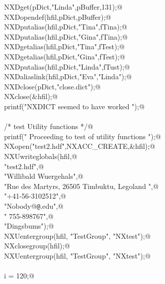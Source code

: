 \documentclass[12pt]{article}
\begin{document}
{\begin{flushleft}
\begin{minipage}{\linewidth}
\begin{list}{}{}
\mbox{}\verb@      NXDget(pDict,"Linda",pBuffer,131);@\\
\mbox{}\verb@      NXDopendef(hfil,pDict,pBuffer);@\\
\mbox{}\verb@      NXDputalias(hfil,pDict,"Tina",fTina);@\\
\mbox{}\verb@      NXDputalias(hfil,pDict,"Gina",fTina);@\\
\mbox{}\verb@      NXDgetalias(hfil,pDict,"Tina",fTest);@\\
\mbox{}\verb@      NXDgetalias(hfil,pDict,"Gina",fTest);@\\
\mbox{}\verb@      NXDputalias(hfil,pDict,"Linda",fTust);@\\
\mbox{}\verb@      NXDaliaslink(hfil,pDict,"Eva","Linda");@\\
\mbox{}\verb@      NXDclose(pDict,"close.dict");@\\
\mbox{}\verb@      NXclose(&hfil);@\\
\mbox{}\verb@      printf("NXDICT seemed to have worked \n");@\\
\mbox{}\verb@@\\
\mbox{}\verb@      /* test Utility functions */@\\
\mbox{}\verb@      printf(" Proceeding to test of utility functions \n");@\\
\mbox{}\verb@      NXopen("test2.hdf",NXACC_CREATE,&hfil);@\\
\mbox{}\verb@      NXUwriteglobals(hfil,@\\
\mbox{}\verb@                      "test2.hdf",@\\
\mbox{}\verb@                      "Willibald Wuergehals",@\\
\mbox{}\verb@                      "Rue des Martyrs, 26505 Timbuktu, Legoland ",@\\
\mbox{}\verb@                      "+41-56-3102512",@\\
\mbox{}\verb@                      "Nobody@{\tt @}\verb@nowhere.edu",@\\
\mbox{}\verb@                      " 755-898767",@\\
\mbox{}\verb@                      "Dingsbums");@\\
\mbox{}\verb@      NXUentergroup(hfil, "TestGroup", "NXtest");@\\
\mbox{}\verb@      NXclosegroup(hfil);@\\
\mbox{}\verb@      NXUentergroup(hfil, "TestGroup", "NXtest");@\\
\mbox{}\verb@@\\
\mbox{}\verb@      i = 120;@\\

\end{list}
\end{minipage}
\end{flushleft}}
\end{document}
